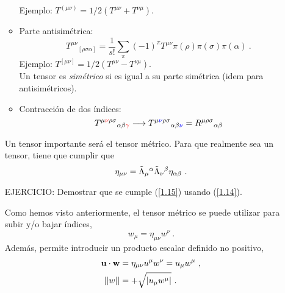 \begin{itemize}
\begin{itemize}
        Ejemplo: $T^{(\mu \nu)} = 1/2 (T^{\mu \nu } + T^{\nu \mu })$.

        \item Parte antisimétrica: 
        $$
        T^{\mu \nu }{}_{[\rho \sigma \alpha ]} = \frac{1}{s!} \sum_\pi (-1)^\pi T^{\mu \nu } \pi(\rho ) \pi (\sigma ) \pi (\alpha )\ .
        $$
        Ejemplo: $T^{[\mu \nu ]} = 1/2 (T^{\mu \nu } - T^{\nu \mu })$.\\

        Un tensor es \emph{simétrico} si es igual a su parte simétrica (idem para antisimétricos).

        \item Contracción de dos índices:
        $$
        T^{\mu \textcolor{red}{\nu} \rho \sigma }{}_{\alpha \beta \textcolor{red}{\gamma} } \longrightarrow T^{\mu \textcolor{blue}{\nu} \rho \sigma }{}_{\alpha \beta \textcolor{blue}{\nu} } = R^{\mu \rho \sigma }{}_{\alpha \beta }
        $$
    \end{itemize}
    Un tensor importante será el tensor métrico. Para que realmente sea un tensor, tiene que cumplir que 
    \begin{equation} \label{1.15}
    \eta_{\mu \nu } = \tilde{\Lambda }_\mu {}^\alpha \Tilde{\Lambda}_\nu {}^\beta \eta _{\alpha \beta }\ .
    \end{equation}
    \begin{mybox}
        EJERCICIO: Demostrar que se cumple (\ref{1.15}) usando (\ref{1.14}).
    \end{mybox}
    Como hemos visto anteriormente, el tensor métrico se puede utilizar para subir y/o bajar índices,
    $$
    w_\mu = \eta_{\mu \nu }w^\nu \ .
    $$
    Además, permite introducir un producto escalar definido no positivo, 
    \begin{equation*}
        \begin{split}
            \mathbf{u}\cdot \mathbf{w} &= \eta_{\mu \nu }u^\mu w^\nu = u_\mu w^\mu \ ,\\
            ||w|| &= + \sqrt{|u_\mu w^\mu |}\ .
        \end{split}
    \end{equation*}
\end{itemize}
